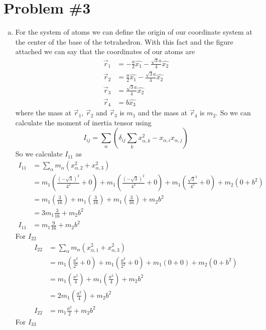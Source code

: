 \documentclass[11pt]{article}
\numberwithin{equation}{section}
\begin{document}
\section{Problem \#3}
\begin{enumerate}[(a)]
\item
For the system of atoms we can define the origin of our coordinate system at the center of the base of the tetrahedron. With this fact and the figure attached we can say that the coordinates of our atoms are
\begin{align*}
\vec{r}_1 &= -\frac{a}{2}\hat{x_1}-\frac{\sqrt{3}a}{4}\hat{x_2}\\
\vec{r}_2 &= \frac{a}{2}\hat{x_1}-\frac{\sqrt{3}a}{4}\hat{x_2}\\
\vec{r}_3 &= \frac{\sqrt{3}a}{4}\hat{x_2}\\
\vec{r}_4 &= b\hat{x_3}
\end{align*}
where the mass at $\vec{r}_1$, $\vec{r}_2$ and $\vec{r}_3$ is $m_1$ and the mass at $\vec{r}_4$ is $m_2$. So we can calculate the moment of inertia tensor using
\begin{equation}
I_{ij} = \sum_{\alpha}\left(\delta_{ij}\sum_kx^2_{\alpha,k}-x_{\alpha,i}x_{\alpha,j}\right)
\label{mominer}
\end{equation}
So we calculate $I_{11}$ as
\begin{align*}
I_{11} &= \sum_{\alpha}m_{\alpha}(x^2_{\alpha,2}+x^2_{\alpha,3})\\
&= m_1\left(\frac{(-\sqrt{3})^2}{4^2}+0\right)+m_1\left(\frac{(-\sqrt{3})^2}{4^2}+0\right)+m_1\left(\frac{\sqrt{3}^2}{4^2}+0\right)+m_2(0+b^2)\\
&= m_1\left(\frac{3}{16}\right)+m_1\left(\frac{3}{16}\right)+m_1\left(\frac{3}{16}\right)+m_2b^2\\
&= 3m_1\frac{3}{16}+m_2b^2\\
I_{11} &= m_1\frac{9}{16}+m_2b^2
\end{align*}
For $I_{22}$
\begin{align*}
I_{22} &= \sum_{\alpha}m_{\alpha}(x^2_{\alpha,1}+x^2_{\alpha,3})\\
&= m_1\left(\frac{a^2}{2^2}+0\right)+m_1\left(\frac{a^2}{2^2}+0\right)+m_1\left(0+0\right)+m_2(0+b^2)\\
&= m_1\left(\frac{a^2}{4}\right)+m_1\left(\frac{a^2}{4}\right)+m_2b^2\\
&= 2m_1\left(\frac{a^2}{4}\right)+m_2b^2\\
I_{22} &= m_1\frac{a^2}{2}+m_2b^2
\end{align*}
For $I_{33}$
\begin{align*}

\end{align*}
\end{enumerate}
\end{document}
